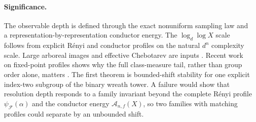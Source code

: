 \documentclass[11pt]{article}
\theoremstyle{definition}
\begin{document}
\paragraph{Significance.}
The observable depth is defined through the exact nonuniform sampling law and a
representation-by-representation conductor energy.  The $\log_d\log X$ scale
follows from explicit R\'enyi and conductor profiles on
the natural $d^n$ complexity scale.  Large arboreal images and effective Chebotarev are
inputs \cite{JonesSurvey,Kadets,ThornerZaman}.  Recent work on fixed-point profiles shows
why the full class-measure tail, rather than group order alone, matters
\cite{Farina}.  The first theorem is bounded-shift stability for one explicit index-two subgroup of the binary wreath tower. A failure would show that resolution depth responds to a family invariant beyond the complete Rényi profile $\psi_{\mathcal F}(\alpha)$ and the conductor energy $\mathcal A_{n,f}(X)$, so two families with matching profiles could separate by an unbounded shift.
\end{document}
